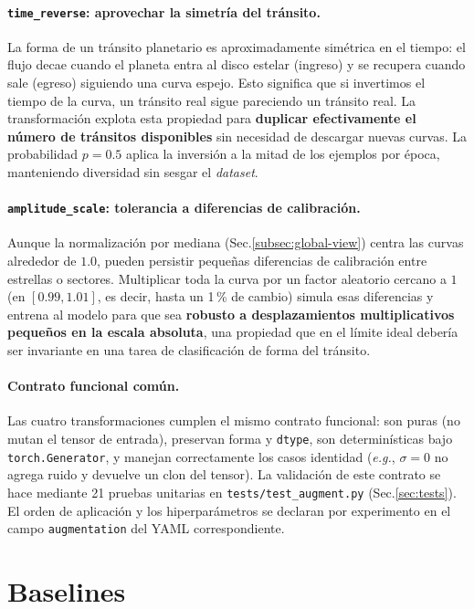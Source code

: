 \documentclass[11pt,a4paper]{article}
\begin{document}
\paragraph{\texttt{time\_reverse}: aprovechar la simetría del tránsito.}
La forma de un tránsito planetario es aproximadamente simétrica en
el tiempo: el flujo decae cuando el planeta entra al disco estelar
(ingreso) y se recupera cuando sale (egreso) siguiendo una curva
espejo. Esto significa que si invertimos el tiempo de la curva, un
tránsito real sigue pareciendo un tránsito real. La transformación
explota esta propiedad para \textbf{duplicar efectivamente el número
de tránsitos disponibles} sin necesidad de descargar nuevas curvas.
La probabilidad $p = 0.5$ aplica la inversión a la mitad de los
ejemplos por época, manteniendo diversidad sin sesgar el
\textit{dataset}.

\paragraph{\texttt{amplitude\_scale}: tolerancia a diferencias de calibración.}
Aunque la normalización por mediana (Sec.\ref{subsec:global-view})
centra las curvas alrededor de $1.0$, pueden persistir pequeñas
diferencias de calibración entre estrellas o sectores. Multiplicar
toda la curva por un factor aleatorio cercano a $1$ (en $[0.99,
1.01]$, es decir, hasta un 1\,\% de cambio) simula esas diferencias y
entrena al modelo para que sea \textbf{robusto a desplazamientos
multiplicativos pequeños en la escala absoluta}, una propiedad que en
el límite ideal debería ser invariante en una tarea de clasificación
de forma del tránsito.

\paragraph{Contrato funcional común.}
Las cuatro transformaciones cumplen el mismo contrato funcional:
son puras (no mutan el tensor de entrada), preservan forma y
\texttt{dtype}, son determinísticas bajo \texttt{torch.Generator}, y
manejan correctamente los casos identidad (\textit{e.g.}, $\sigma=0$
no agrega ruido y devuelve un clon del tensor). La validación de este
contrato se hace mediante 21 pruebas unitarias en
\texttt{tests/test\_augment.py} (Sec.\ref{sec:tests}). El orden de
aplicación y los hiperparámetros se declaran por experimento en el
campo \texttt{augmentation} del YAML correspondiente.

\section{Baselines}
\label{sec:baselines}
\end{document}

